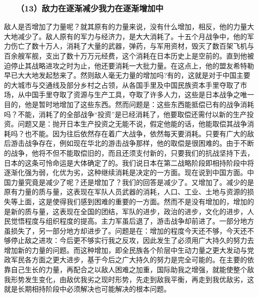 \documentclass[cn,11pt,chinese]{elegantbook}
\def\myformat#1{\hfil\hfil #1}
\begin{document}
\subsubsection*{\myformat{　　（13）敌力在逐渐减少我力在逐渐增加中}}
敌人是否增加了力量呢？就其原有的力量来说，没有什么增加，相反，他的力量大大地减少了。敌人原有的军力与经济力，是大大消耗了。十五个月战争中，他的军力伤亡了数十万人，消耗了大量的武器，弹药，与军用资材，毁灭了数百架飞机与百余艘军舰，支出了数十万万元经费，这个消耗在日本历史上是空前的。直到他被迫停止其战略进攻之时为止，他还要消耗一大批力量。在这点上，他的盟友希特勒早已大大地发起愁来了。然则敌人毫无力量的增加吗?有的，这就是对于中国主要的大城市与交通线及部分乡村之占领，从各国手里及中国民族资本手里夺取了市场，从中国手里夺取了资源与生产工具，夺取了许多人力，这些是日本战争之唯一目的，他是暂时地增加了这些东西。然而问题是：这些东西能抵偿已有的战争消耗吗？不能，消耗了的全部战争“投资”是已经消耗了，他要取偿还需付以新的生产投资。问题又是：抛开日本生产投资之无能不说，假定他能的话，他能取偿其战争消耗吗？也不能。因为往后依然存在着广大战争，依然每天要消耗。只要有广大的敌后游击战争存在，例如现在华北的游击战争那样，他的取偿是很困难的。由于不断的战争，他将不但不能取偿旧的，而且还须支付新的，只要我们的抗战坚持下去，日本的这条可怜命运是大体确定了的。我们说日本在第二战略阶段即相持阶段中将逐渐化强为弱，化优为劣，这种继续消耗是决定的一方面。现在说到中国方面。中国力量究竟是减少了呢？还是增加了？我们的回答是减少了。又增加了。减少的是原有力量的质与量，这表现在军队人员武器的消耗，人口、工业、土地与资源的损失等上面，这是使得我们感到困难的重要的一方面。然而不是没有增加的，增加的是新的质与量，这表现在全国的团结，军队的进步，政治的进步，文化的进步，人民觉悟程度与组织程度的提高。主力军虽后退了，游击战争却前进了。一部分地方虽损失了，另一部分地方却进步了。问题是在：增加的程度今天还不够，今天还不够停止敌之进攻：今后更不够实行我之反攻，因此发生了必须用广大持久的努力去增加新的力量的问题。而这种增加，即全民族各个阶层中生动力量之更大发动与党政军民各方面之更大进步，基于今后之广大持久的努力是完全可能的。在主要的依靠自己生长的力量，再配合之以敌人困难之加重，国际助我之增强，就能使整个敌我形势发生变化，由敌优我劣之现时形势，先走到敌我平衡，再走到我优敌劣，这就是长期相持阶段中必须解决也可能解决的根本问题。\\
\end{document}
